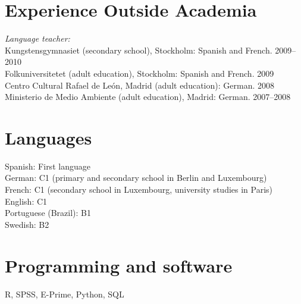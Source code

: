 \documentclass[margin, 11pt]{res} %
\begin{document}
\begin{resume}
\section{\sc Experience Outside Academia}

\textsl{Language teacher:} \\
Kungstensgymnasiet (secondary school), Stockholm: Spanish  and French. 2009--2010 \\
Folkuniversitetet (adult education), Stockholm: Spanish and French. 2009 \\
Centro Cultural Rafael de Le\'{o}n, Madrid (adult education): German. 2008 \\ 
Ministerio de Medio Ambiente (adult education), Madrid: German. 2007--2008 \\ 







\section{\sc Languages}

Spanish: First language \\
German: C1 (primary and secondary school in Berlin and Luxembourg)\\
French: C1 (secondary school in Luxembourg, university studies in Paris)\\
English: C1\\
Portuguese (Brazil): B1\\
Swedish: B2\\


\section{\sc Programming and software}
R, SPSS, E-Prime, Python, SQL





\end{resume}
\end{document}
